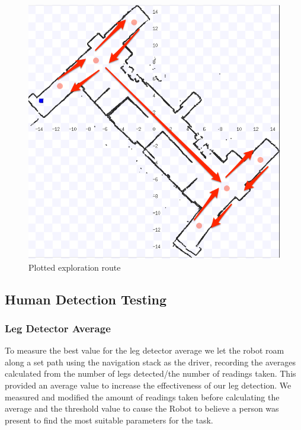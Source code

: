 \documentclass{article}
\begin{document}
\begin{multicols}{2}
          \begin{figure}[H]
              \includegraphics[width=\linewidth]{ExperimentalResults10}
              \caption{Plotted exploration route}
          \end{figure}
	
	\subsection{Human Detection Testing}
	\subsubsection{Leg Detector Average}
	To measure the best value for the leg detector average we let the robot roam along a set path using the navigation stack as the driver, recording the averages calculated from the number of legs detected/the number of readings taken. This provided an average value to increase the effectiveness of our leg detection. We measured and modified the amount of readings taken before calculating the average and the threshold value to cause the Robot to believe a person was present to find the most suitable parameters for the task.
	\end{multicols}
\end{document}
